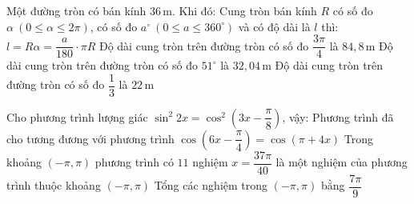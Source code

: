 \begin{ex} %
	Một đường tròn có bán kính $36\,\mathrm{m}$. Khi đó:
	\choiceTF
	{Cung tròn bán kính $R$ có số đo $\alpha\ (0 \le \alpha \le 2\pi)$, có số đo $a^\circ\ (0 \le a \le 360^\circ)$ và có độ dài là $l$ thì:
		$l = R\alpha = \dfrac{a}{180} \cdot \pi R$}
	{\True Độ dài cung tròn trên đường tròn có số đo $\dfrac{3\pi}{4}$ là $84,8\,\mathrm{m}$}
	{\True Độ dài cung tròn trên đường tròn có số đo $51^\circ$ là $32,04\,\mathrm{m}$}
	{Độ dài cung tròn trên đường tròn có số đo $\dfrac{1}{3}$ là $22\,\mathrm{m}$}
\end{ex}

\begin{ex} %
	Cho phương trình lượng giác $\sin^2 2x = \cos^2 \left( 3x - \dfrac{\pi}{8} \right)$, vậy:
	\choiceTF
	{\True Phương trình đã cho tương đương với phương trình $\cos \left( 6x - \dfrac{\pi}{4} \right) = \cos (\pi + 4x)$}
	{\True Trong khoảng $(-\pi, \pi)$ phương trình có $11$ nghiệm}
	{\True $x = \dfrac{37\pi}{40}$ là một nghiệm của phương trình thuộc khoảng $(-\pi, \pi)$}
	{Tổng các nghiệm trong $(-\pi, \pi)$ bằng $\dfrac{7\pi}{9}$}
\end{ex}

